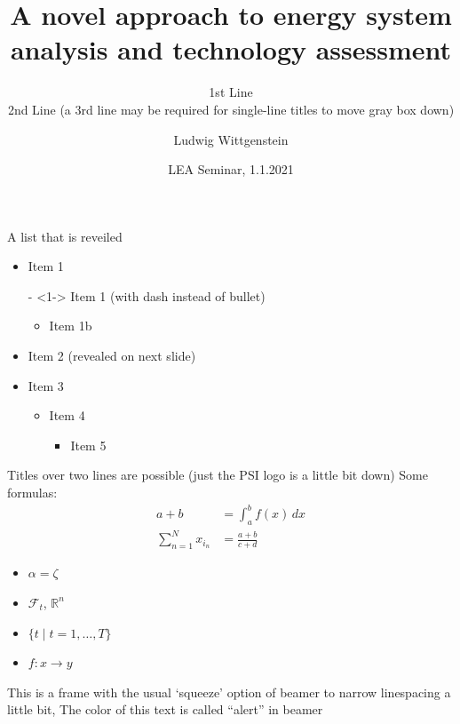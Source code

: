 \documentclass[aspectratio=169]{beamer}
\begin{document}
\title{A novel approach to energy system analysis and technology assessment}

\author[L.~Wittgenstein]{Ludwig Wittgenstein}


\subtitle{1st Line\\2nd Line (a 3rd line may be required for single-line titles to move gray box down)}

\date{LEA Seminar, 1.1.2021} %


\begin{frame}[plain] %
  \titlepage
\end{frame}


\begin{frame}{A list that is reveiled}  
  \begin{itemize}
  \item<1-> Item 1
  \item[-]<1->  Item 1 (with dash instead of bullet)
    \begin{itemize}
    \item<1-> Item 1b
    \end{itemize}
  \item<2->  Item 2 (revealed on next slide)
  \item<3-> Item 3
    \begin{itemize}
    \item<3-> Item 4
      \begin{itemize}
      \item<3-> Item 5
      \end{itemize}
    \end{itemize}
  \end{itemize}
 \vspace*{\fill} %
\end{frame}



\begin{frame}[squeeze]{Titles over two lines are possible (just the PSI logo is a little bit down)}
  Some formulas:
  \begin{align*}
    a + b  & = \int_a^b f(x)\,dx \\
    \sum_{n=1}^N x_{i_n} &= \frac{a+b}{c+d} 
  \end{align*}
  \begin{itemize}
  \item  $\alpha = \zeta$ 
  \item $\mathcal{F}_t$, $\mathbb{R}^n$
  \item $\{t \mid t=1,\dots,T\}$
  \item $f\colon x\to y$
  \end{itemize}
   \alert{This is a frame with the usual `squeeze' option of beamer to narrow linespacing a little bit, The color of this text is called ``alert'' in beamer}
  
\end{frame}
\end{document}

